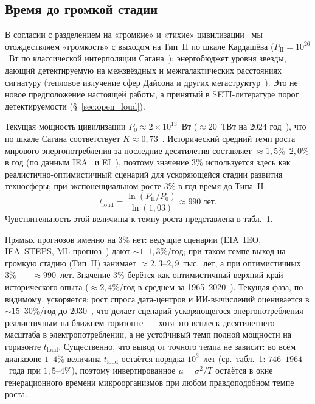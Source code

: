 \documentclass[12pt,a4paper]{article}
\begin{document}
\subsection{Время до громкой стадии}
\label{sec:loud_time}

В согласии с разделением на «громкие» и «тихие» цивилизации~\cite{Hanson2021} мы отождествляем «громкость» с выходом на Тип~II по шкале Кардашёва ($P_{\mathrm{II}} = 10^{26}$~Вт по классической интерполяции Сагана~\cite{Kardashev1964,Sagan1973}): энергобюджет уровня звезды, дающий детектируемую на межзвёздных и межгалактических расстояниях сигнатуру (тепловое излучение сфер Дайсона и других мегаструктур~\cite{Dyson1960,Wright2014}). Это не новое предположение настоящей работы, а принятый в SETI-литературе порог детектируемости (\S~\ref{sec:open_loud}).

Текущая мощность цивилизации $P_0 \approx 2 \times 10^{13}$~Вт ($\approx 20$~ТВт на 2024 год~\cite{EI2024}), что по шкале Сагана соответствует $K \approx 0{,}73$~\cite{Sagan1973,Zhang2023}. Исторический средний темп роста мирового энергопотребления за последние десятилетия составляет $\approx 1{,}5\%$--$2{,}0\%$ в год (по данным IEA~\cite{IEA2023} и EI~\cite{EI2024}), поэтому значение $3\%$ используется здесь как реалистично-оптимистичный сценарий для ускоряющейся стадии развития техносферы; при экспоненциальном росте $3\%$ в год время до Типа~II:
\begin{equation}
t_{\mathrm{loud}} = \frac{\ln(P_{\mathrm{II}}/P_0)}{\ln(1{,}03)} \approx 990~\text{лет}.
\end{equation}
Чувствительность этой величины к темпу роста представлена в табл.~1.

\medskip
Прямых прогнозов именно на $3\%$ нет: ведущие сценарии (EIA~IEO, IEA~STEPS, ML-прогноз~\cite{Zhang2023}) дают $\sim 1$--$1{,}3\%$/год; при таком темпе выход на громкую стадию (Тип~II) занимает $\approx 2{,}3$--$2{,}9$~тыс.~лет, а при оптимистичных $3\%$~--- $\approx 990$~лет. Значение $3\%$ берётся как оптимистичный верхний край исторического опыта ($\approx 2{,}4\%$/год в среднем за 1965--2020~\cite{Smil2017,EI2024}). Текущая фаза, по-видимому, ускоряется: рост спроса дата-центров и ИИ-вычислений оценивается в $\sim 15$--$30\%$/год до 2030~\cite{IEA2025AI}, что делает сценарий ускоряющегося энергопотребления реалистичным на ближнем горизонте~--- хотя это всплеск десятилетнего масштаба в электропотреблении, а не устойчивый темп полной мощности на горизонте $t_{\mathrm{loud}}$. Существенно, что вывод от точного темпа не зависит: во всём диапазоне $1$--$4\%$ величина $t_{\mathrm{loud}}$ остаётся порядка $10^3$~лет (ср.\ табл.~1: $746$--$1964$~года при $1{,}5$--$4\%$), поэтому инвертированное $\mu = \sigma^2/T$ остаётся в окне генерационного времени микроорганизмов при любом правдоподобном темпе роста.
\end{document}
